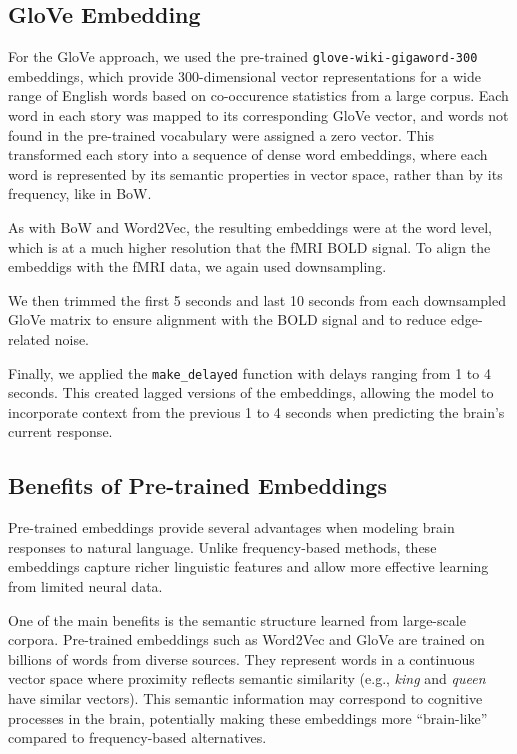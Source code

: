 \documentclass[11pt,letterpaper]{article}
\begin{document}
\vspace{1em} %
\subsection{GloVe Embedding}
\vspace{0.5em} %

For the GloVe approach, we used the pre-trained \texttt{glove-wiki-gigaword-300} embeddings, which provide 300-dimensional vector representations for a wide range of English words based on co-occurence statistics from a large corpus. Each word in each story was mapped to its corresponding GloVe vector, and words not found in the pre-trained vocabulary were assigned a zero vector. This transformed each story into a sequence of dense word embeddings, where each word is represented by its semantic properties in vector space, rather than by its frequency, like in BoW.

As with BoW and Word2Vec, the resulting embeddings were at the word level, which is at a much higher resolution that the fMRI BOLD signal. To align the embeddigs with the fMRI data, we again used downsampling.

We then trimmed the first 5 seconds and last 10 seconds from each downsampled GloVe matrix to ensure alignment with the BOLD signal and to reduce edge-related noise. 

Finally, we applied the \texttt{make\_delayed} function with delays ranging from 1 to 4 seconds. This created lagged versions of the embeddings, allowing the model to incorporate context from the previous 1 to 4 seconds when predicting the brain's current response. 

\vspace{1em} %
\subsection{Benefits of Pre-trained Embeddings}
\vspace{0.5em} %
Pre-trained embeddings provide several advantages when modeling brain responses to natural language. Unlike frequency-based methods, these embeddings capture richer linguistic features and allow more effective learning from limited neural data.

One of the main benefits is the semantic structure learned from large-scale corpora. Pre-trained embeddings such as Word2Vec and GloVe are trained on billions of words from diverse sources. They represent words in a continuous vector space where proximity reflects semantic similarity (e.g., \textit{king} and \textit{queen} have similar vectors). This semantic information may correspond to cognitive processes in the brain, potentially making these embeddings more ``brain-like'' compared to frequency-based alternatives.
\end{document}
